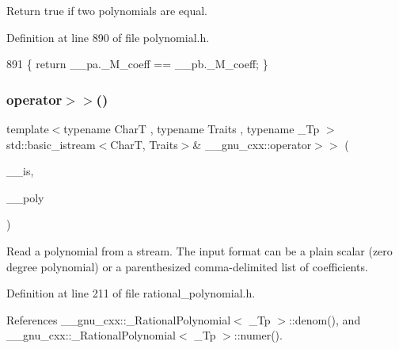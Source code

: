 Return true if two polynomials are equal. 

Definition at line 890 of file polynomial.\+h.


\begin{DoxyCode}
891     \{ \textcolor{keywordflow}{return} \_\_pa.\_M\_coeff == \_\_pb.\_M\_coeff; \}
\end{DoxyCode}
\mbox{\label{namespace____gnu__cxx_a71511bc907f332ce9bb925c953f11714}} 
\subsubsection{\texorpdfstring{operator$>$$>$()}{operator>>()}\hspace{0.1cm}{\footnotesize\ttfamily [1/2]}}
{\footnotesize\ttfamily template$<$typename CharT , typename Traits , typename \+\_\+\+Tp $>$ \\
std\+::basic\+\_\+istream$<$CharT, Traits$>$\& \+\_\+\+\_\+gnu\+\_\+cxx\+::operator$>$$>$ (\begin{DoxyParamCaption}\item[{std\+::basic\+\_\+istream$<$ CharT, Traits $>$ \&}]{\+\_\+\+\_\+is,  }\item[{\hyperlink{class____gnu__cxx_1_1__RationalPolynomial}{\+\_\+\+Rational\+Polynomial}$<$ \+\_\+\+Tp $>$ \&}]{\+\_\+\+\_\+poly }\end{DoxyParamCaption})}

Read a polynomial from a stream. The input format can be a plain scalar (zero degree polynomial) or a parenthesized comma-\/delimited list of coefficients. 

Definition at line 211 of file rational\+\_\+polynomial.\+h.



References \+\_\+\+\_\+gnu\+\_\+cxx\+::\+\_\+\+Rational\+Polynomial$<$ \+\_\+\+Tp $>$\+::denom(), and \+\_\+\+\_\+gnu\+\_\+cxx\+::\+\_\+\+Rational\+Polynomial$<$ \+\_\+\+Tp $>$\+::numer().


